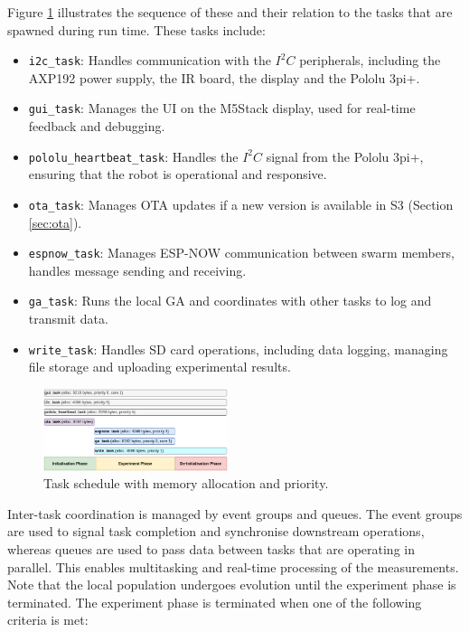 \documentclass[conference]{IEEEtran}
\begin{document}
Figure \ref{fig:rtos} illustrates the sequence of these and their relation to the tasks that are spawned during run time. These tasks include:

\begin{itemize}
  \item \texttt{i2c\_task}: Handles communication with the $I^2C$ peripherals, including the AXP192 power supply, the IR board, the display and the Pololu 3pi+.
  \item \texttt{gui\_task}: Manages the UI on the M5Stack display, used for real-time feedback and debugging.
  \item \texttt{pololu\_heartbeat\_task}: Handles the $I^2C$ signal from the Pololu 3pi+, ensuring that the robot is operational and responsive.
  \item \texttt{ota\_task}: Manages OTA updates if a new version is available in S3 (Section \ref{sec:ota}).
  \item \texttt{espnow\_task}: Manages ESP-NOW communication between swarm members, handles message sending and receiving.
  \item \texttt{ga\_task}: Runs the local GA and coordinates with other tasks to log and transmit data.
  \item \texttt{write\_task}: Handles SD card operations, including data logging, managing file storage and uploading experimental results.
\end{itemize}

\begin{figure}[H]
    \centering
    \includegraphics[width=0.48\textwidth]{rtos.png}
    \caption{Task schedule with memory allocation and priority.}
    \label{fig:rtos}
\end{figure}

Inter-task coordination is managed by event groups and queues. The event groups are used to signal task completion and synchronise downstream operations, whereas queues are used to pass data between tasks that are operating in parallel. This enables multitasking and real-time processing of the measurements.\\ 

Note that the local population undergoes evolution until the experiment phase is terminated. The experiment phase is terminated when one of the following criteria is met:
\end{document}
